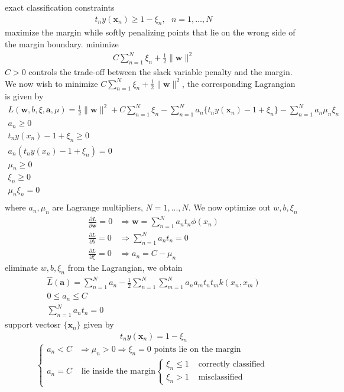 \documentclass[a4paper]{article}
\begin{document}
exact classification constraints
\begin{align}
t_ny(\mathbf{x}_n) \geq 1 - \xi_n, \text{    $n=1,\dots,N$}
\end{align}
maximize the margin while softly penalizing points that lie on the
wrong side of the margin boundary. minimize
\begin{align}
C\sum_{n=1}^N \xi_n + \frac{1}{2}\|\mathbf{w}\|^2
\end{align}
$C > 0$ controls the trade-off between the slack variable penalty and the margin.
We now wish to minimize $C\sum_{n=1}^N \xi_n+\frac{1}{2}\|\mathbf{w}\|^2$, the corresponding Lagrangian is given by
\begin{align}
L(\mathbf{w},b,\xi,\mathbf{a},\mu) = \frac{1}{2}\|\mathbf{w}\|^2 +
  C\sum_{n=1}^N \xi_n - \sum_{n=1}^Na_n\{t_ny(\mathbf{x}_n)-1+\xi_n\} -\sum_{n=1}^Na_n\mu_n\xi_n\\
a_n \geq 0\\
t_ny(x_n)-1+\xi_n \geq 0\\
a_n(t_ny(x_n)-1+\xi_n) = 0\\
\mu_n \geq 0\\
\xi_n \geq 0\\
\mu_n \xi_n = 0\\
\end{align}
where $a_n, \mu_n$ are Lagrange multipliers, $N=1,...,N$.
We now optimize out $w, b, \xi_n$
\begin{align}
\frac{\partial L}{\partial \mathbf{w}} = 0 &\Rightarrow \mathbf{w} =
  \sum_{n=1}^N a_nt_n\phi(x_n)\\
\frac{\partial L}{\partial b} = 0 &\Rightarrow \sum_{n=1}^N a_nt_n = 0\\
\frac{\partial L}{\partial \xi} = 0 &\Rightarrow a_n = C - \mu_n
\end{align}
eliminate $w, b, \xi_n$ from the Lagrangian, we obtain
\begin{align}
\widehat{L}(\mathbf{a}) = \sum_{n=1}^N a_n - \frac{1}{2}
  \sum_{n=1}^N\sum_{m=1}^N a_na_mt_nt_mk(x_n,x_m)\\
0 \leq a_n \leq C\\
\sum_{n=1}^Na_nt_n = 0
\end{align}
support vectosr $\{\mathbf{x}_n\}$ given by
\begin{align}
t_ny(\mathbf{x}_n) = 1-\xi_n
\end{align}
\[
\begin{cases}
 a_n<C & \Rightarrow \mu_n>0 \Rightarrow \xi_n=0 \text{ points lie on the margin}\\
 a_n=C & \text{ lie inside the margin}
 \begin{cases}
   \xi_n \leq 1 &\text{ correctly classified}\\
   \xi_n > 1 & \text{ misclassiﬁed}
 \end{cases}
\end{cases}
\]
\end{document}
